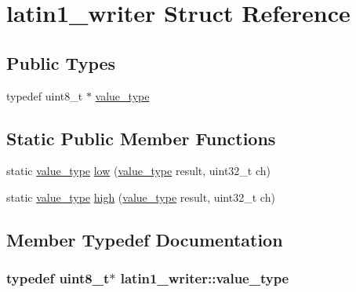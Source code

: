 \hypertarget{structlatin1__writer}{\section{latin1\-\_\-writer Struct Reference}
\label{structlatin1__writer}
}
\subsection*{Public Types}
\begin{DoxyCompactItemize}
\item 
typedef uint8\-\_\-t $\ast$ \hyperlink{structlatin1__writer_af9228600fa7eecd793cc3d927d46eb1a}{value\-\_\-type}
\end{DoxyCompactItemize}
\subsection*{Static Public Member Functions}
\begin{DoxyCompactItemize}
\item 
static \hyperlink{structlatin1__writer_af9228600fa7eecd793cc3d927d46eb1a}{value\-\_\-type} \hyperlink{structlatin1__writer_ab5d7a833d29d66031420686ca67b1f6e}{low} (\hyperlink{structlatin1__writer_af9228600fa7eecd793cc3d927d46eb1a}{value\-\_\-type} result, uint32\-\_\-t ch)
\item 
static \hyperlink{structlatin1__writer_af9228600fa7eecd793cc3d927d46eb1a}{value\-\_\-type} \hyperlink{structlatin1__writer_a0e48c306ebe556f267404a9624f00554}{high} (\hyperlink{structlatin1__writer_af9228600fa7eecd793cc3d927d46eb1a}{value\-\_\-type} result, uint32\-\_\-t ch)
\end{DoxyCompactItemize}


\subsection{Member Typedef Documentation}
\hypertarget{structlatin1__writer_af9228600fa7eecd793cc3d927d46eb1a}{
\subsubsection[{value\-\_\-type}]{\setlength{\rightskip}{0pt plus 5cm}typedef uint8\-\_\-t$\ast$ {\bf latin1\-\_\-writer\-::value\-\_\-type}}}\label{structlatin1__writer_af9228600fa7eecd793cc3d927d46eb1a}


